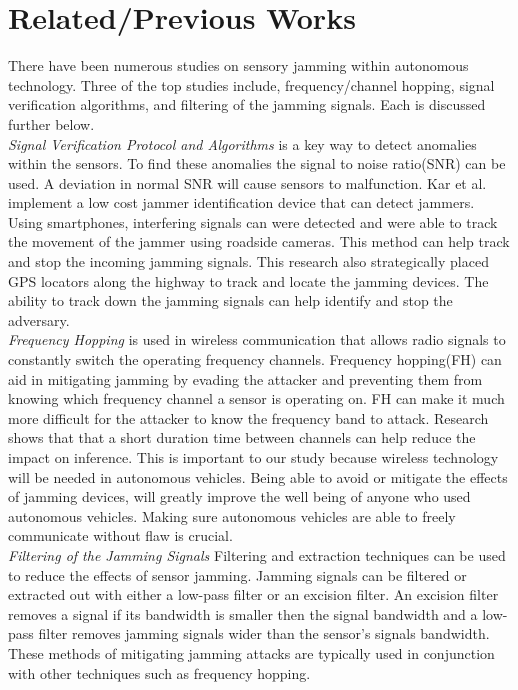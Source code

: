 \documentclass[conference]{IEEEtran}
\begin{document}
\section{Related/Previous Works}
There have been numerous studies on sensory jamming within autonomous technology. Three of the top studies include, frequency/channel hopping, signal verification algorithms, and filtering of the jamming signals. Each is discussed further below.\\

\textit{Signal Verification Protocol and Algorithms} is a key way to detect anomalies within the sensors. To find these anomalies the signal to noise ratio(SNR) can be used. A deviation in normal SNR will cause sensors to malfunction. Kar et al.\cite{6} implement a low cost jammer identification device that can detect jammers. Using smartphones, interfering signals can were detected and were able to track the movement of the jammer using roadside cameras. This method can help track and stop the incoming jamming signals. This research also strategically placed GPS locators along the highway to track and locate the jamming devices\cite{6}. The ability to track down the jamming signals can help identify and stop the adversary.\\ 
\textit{Frequency Hopping} is used in wireless communication that allows radio signals to constantly switch the operating frequency channels. Frequency hopping(FH) can aid in mitigating jamming by evading the attacker and preventing them from knowing which frequency channel a sensor is operating on. FH can make it much more difficult for the attacker to know the frequency band to attack\cite{1}\cite{3}\cite{2}. Research shows that that a short duration time between channels can help reduce the impact on inference\cite{1}. This is important to our study because wireless technology will be needed in autonomous vehicles. Being able to avoid or mitigate the effects of jamming devices, will greatly improve the well being of anyone who used autonomous vehicles. Making sure autonomous vehicles are able to freely communicate without flaw is crucial.\\ 
\textit{Filtering of the Jamming Signals} Filtering and extraction techniques can be used to reduce the effects of sensor jamming\cite{5}.  Jamming signals can be filtered or extracted out with either a low-pass filter or an excision filter.  An excision filter removes a signal if its bandwidth is smaller then the signal bandwidth and a low-pass filter removes jamming signals wider than the sensor's signals bandwidth\cite{5}. These methods of mitigating jamming attacks are typically used in conjunction with other techniques such as frequency hopping\cite{5}.\\
\end{document}

